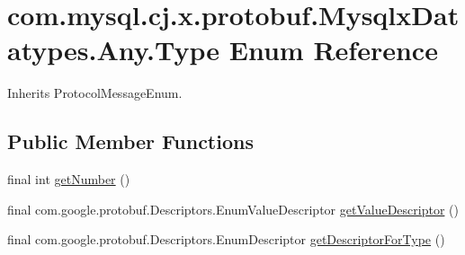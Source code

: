 \hypertarget{enumcom_1_1mysql_1_1cj_1_1x_1_1protobuf_1_1_mysqlx_datatypes_1_1_any_1_1_type}{}\section{com.\+mysql.\+cj.\+x.\+protobuf.\+Mysqlx\+Datatypes.\+Any.\+Type Enum Reference}
\label{enumcom_1_1mysql_1_1cj_1_1x_1_1protobuf_1_1_mysqlx_datatypes_1_1_any_1_1_type}


Inherits Protocol\+Message\+Enum.

\subsection*{Public Member Functions}
\begin{DoxyCompactItemize}
\item 
final int \mbox{\hyperlink{enumcom_1_1mysql_1_1cj_1_1x_1_1protobuf_1_1_mysqlx_datatypes_1_1_any_1_1_type_ac9686099e989c0f2036ae131f7723695}{get\+Number}} ()
\item 
final com.\+google.\+protobuf.\+Descriptors.\+Enum\+Value\+Descriptor \mbox{\hyperlink{enumcom_1_1mysql_1_1cj_1_1x_1_1protobuf_1_1_mysqlx_datatypes_1_1_any_1_1_type_a1163ac9e2037bcd2c041bd1f0f44f029}{get\+Value\+Descriptor}} ()
\item 
final com.\+google.\+protobuf.\+Descriptors.\+Enum\+Descriptor \mbox{\hyperlink{enumcom_1_1mysql_1_1cj_1_1x_1_1protobuf_1_1_mysqlx_datatypes_1_1_any_1_1_type_a50b1fbc7d3bd18ad4da74a9ad9b2ecf6}{get\+Descriptor\+For\+Type}} ()
\end{DoxyCompactItemize}
